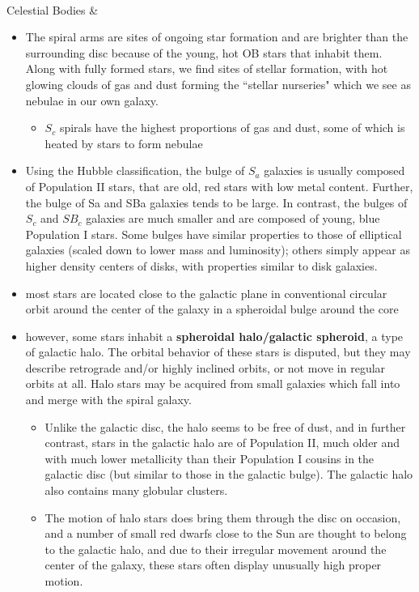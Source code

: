 \begin{longtabu}
\begin{itemize}[noitemsep]
	\end{itemize}
	\\
	\hline
	Celestial Bodies &
	\begin{itemize}[noitemsep]
		\item  The spiral arms are sites of ongoing star formation and are brighter than the surrounding disc because of the young, hot OB stars that inhabit them. Along with fully formed stars, we find sites of stellar formation, with hot glowing clouds of gas and dust forming the ``stellar nurseries" which we see as nebulae in our own galaxy.
			\begin{itemize}[noitemsep]
				\item $S_c$ spirals have the highest proportions of gas and dust, some of which is heated by stars to form nebulae
			\end{itemize}
		\item Using the Hubble classification, the bulge of $S_a$ galaxies is usually composed of Population II stars, that are old, red stars with low metal content. Further, the bulge of Sa and SBa galaxies tends to be large. In contrast, the bulges of $S_c$ and $SB_c$ galaxies are much smaller and are composed of young, blue Population I stars. Some bulges have similar properties to those of elliptical galaxies (scaled down to lower mass and luminosity); others simply appear as higher density centers of disks, with properties similar to disk galaxies.
		\item most stars are located close to the \gls{galactic plane} in conventional circular orbit around the center of the galaxy in a spheroidal bulge around the core
		\item however, some stars inhabit a \textbf{spheroidal halo/galactic spheroid}, a type of galactic halo. The orbital behavior of these stars is disputed, but they may describe retrograde and/or highly inclined orbits, or not move in regular orbits at all. Halo stars may be acquired from small galaxies which fall into and merge with the spiral galaxy.
			\begin{itemize}[noitemsep]
				\item Unlike the galactic disc, the halo seems to be free of dust, and in further contrast, stars in the galactic halo are of Population II, much older and with much lower metallicity than their Population I cousins in the galactic disc (but similar to those in the galactic bulge). The galactic halo also contains many globular clusters.
				\item The motion of halo stars does bring them through the disc on occasion, and a number of small red dwarfs close to the Sun are thought to belong to the galactic halo, and due to their irregular movement around the center of the galaxy, these stars often display unusually high proper motion.

\end{itemize}
\end{itemize}
\end{longtabu}
